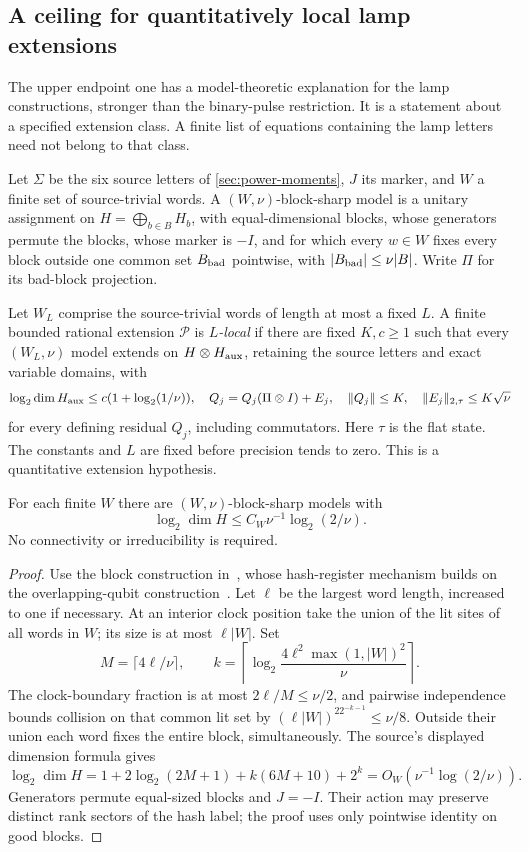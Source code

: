 \subsection{A ceiling for quantitatively local lamp extensions}\label{sec:local-lamp-ceiling}
The upper endpoint one has a model-theoretic explanation for the lamp constructions, stronger than the binary-pulse restriction. It is a statement about a specified extension class. A finite list of equations containing the lamp letters need not belong to that class.

\begin{definition}\label{def:lamp-locality}
Let $\Sigma$ be the six source letters of \cref{sec:power-moments}, $J$ its marker, and $W$ a finite set of source-trivial words. A $(W,\nu)$-block-sharp model is a unitary assignment on $H=\bigoplus_{b\in B}H_b$, with equal-dimensional blocks, whose generators permute the blocks, whose marker is $-I$, and for which every $w\in W$ fixes every block outside one common set $B_{\rm bad}$ pointwise, with $|B_{\rm bad}|\le\nu|B|$. Write $\Pi$ for its bad-block projection.

Let $W_L$ comprise the source-trivial words of length at most a fixed $L$. A finite bounded rational extension $\mathcal P$ is \emph{$L$-local} if there are fixed $K,c\ge1$ such that every $(W_L,\nu)$ model extends on $H\otimes H_{\rm aux}$, retaining the source letters and exact variable domains, with
\[
 \log_2\dim H_{\rm aux}\le c(1+\log_2(1/\nu)),\quad
 Q_j=Q_j(\Pi\otimes I)+E_j,\quad
 \|Q_j\|\le K,\quad \|E_j\|_{2,\tau}\le K\sqrt\nu
\]
for every defining residual $Q_j$, including commutators. Here $\tau$ is the flat state. The constants and $L$ are fixed before precision tends to zero. This is a quantitative extension hypothesis.
\end{definition}

\begin{lemma}\label{lem:lamp-sharp-models}
For each finite $W$ there are $(W,\nu)$-block-sharp models with
\[
 \log_2\dim H\le C_W\nu^{-1}\log_2(2/\nu).
\]
No connectivity or irreducibility is required.
\end{lemma}
\begin{proof}
Use the block construction in~\cite[Proposition~9.4]{DM-game}, whose hash-register mechanism builds on the overlapping-qubit construction~\cite{CRSV17}. Let $\ell$ be the largest word length, increased to one if necessary. At an interior clock position take the union of the lit sites of all words in $W$; its size is at most $\ell|W|$. Set
\[
 M=\lceil4\ell/\nu\rceil,\qquad
 k=\left\lceil\log_2\frac{4\ell^2\max(1,|W|)^2}{\nu}\right\rceil.
\]
The clock-boundary fraction is at most $2\ell/M\le\nu/2$, and pairwise independence bounds collision on that common lit set by $(\ell|W|)^22^{-k-1}\le\nu/8$. Outside their union each word fixes the entire block, simultaneously. The source's displayed dimension formula gives
\[
 \log_2\dim H=1+2\log_2(2M+1)+k(6M+10)+2^k
             =O_W(\nu^{-1}\log(2/\nu)).
\]
Generators permute equal-sized blocks and $J=-I$. Their action may preserve distinct rank sectors of the hash label; the proof uses only pointwise identity on good blocks.
\end{proof}

